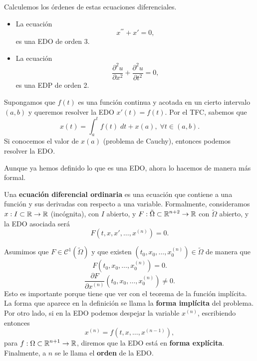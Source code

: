 \begin{eg} Calculemos los órdenes de estas ecuaciones diferenciales. 
\begin{itemize}
\item La ecuación
\[x^{'''}+x'=0 ,\]
es una EDO de orden 3.
\item La ecuación
	\[\frac{\partial^{2}u}{\partial x^{2}} + \frac{\partial^{2}u}{\partial t ^{2}} = 0 ,\]
	es una EDP de orden 2.
\end{itemize}
\end{eg}
\begin{eg}
Supongamos que $\displaystyle f\left(t\right) $ es una función continua y acotada en un cierto intervalo $\displaystyle \left(a,b\right) $ y queremos resolver la EDO $\displaystyle x'\left(t\right) = f\left(t\right) $. Por el TFC, sabemos que 
\[x\left(t\right) = \int^{t}_{a} f\left(t\right) \; dt + x\left(a\right), \; \forall t \in \left(a,b\right) .\]
Si conocemos el valor de $\displaystyle x\left(a\right) $ (problema de Cauchy), entonces podemos resolver la EDO.
\end{eg}
Aunque ya hemos definido lo que es una EDO, ahora lo hacemos de manera más formal. 
\begin{definition}[EDO]
	Una \textbf{ecuación diferencial ordinaria} es una ecuación que contiene a una función y sus derivadas con respecto a una variable. Formalmente, consideramos $\displaystyle x : I \subset \mathbb{R} \to \mathbb{R} $ (incógnita), con $\displaystyle I $ abierto, y $\displaystyle F : \tilde{\Omega} \subset \mathbb{R}^{n+2}\to \mathbb{R} $ con $\displaystyle \tilde{\Omega} $ abierto, y la EDO asociada será
	\[F\left(t, x, x', \ldots, x^{\left(n\right)}\right) = 0 .\]
\end{definition}
Asumimos que $\displaystyle F \in \mathcal{C}^{1}\left(\tilde{\Omega }\right) $ y que existen $\displaystyle \left(t_{0}, x_{0}, \ldots, x_{0}^{\left(n\right)}\right) \in \tilde{\Omega } $ de manera que 
\[F\left(t_{0}, x_{0}, \ldots, x^{\left(n\right)}_{0}\right) = 0 .\]
\[\frac{\partial F}{\partial x^{\left(n\right)}}\left(t_{0}, x_{0}, \ldots, x_{0}^{\left(n\right)}\right) \neq 0 .\]
Esto es importante porque tiene que ver con el teorema de la función implícita. La forma que aparece en la definición se llama la \textbf{forma implícita} del problema. Por otro lado, si en la EDO podemos despejar la variable $\displaystyle x^{\left(n\right)} $, escribiendo entonces
\[x^{\left(n\right)} = f\left(t, x, \ldots, x^{\left(n-1\right)}\right) ,\]
para $\displaystyle f : \Omega \subset \mathbb{R}^{n+1} \to \mathbb{R} $, diremos que la EDO está en \textbf{forma explícita}. Finalmente, a $\displaystyle n $ se le llama el \textbf{orden} de la EDO. \\
